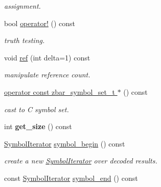 \begin{DoxyCompactItemize}
\begin{DoxyCompactList}\small\item\em assignment. \end{DoxyCompactList}\item 
\hypertarget{classzbar_1_1_symbol_set_a716f662ca284be814f013726361a3723}{
bool \hyperlink{classzbar_1_1_symbol_set_a716f662ca284be814f013726361a3723}{operator!} () const }
\label{classzbar_1_1_symbol_set_a716f662ca284be814f013726361a3723}

\begin{DoxyCompactList}\small\item\em truth testing. \end{DoxyCompactList}\item 
\hypertarget{classzbar_1_1_symbol_set_a9dc9218a6391a4bfdef5eca99d1bb71f}{
void \hyperlink{classzbar_1_1_symbol_set_a9dc9218a6391a4bfdef5eca99d1bb71f}{ref} (int delta=1) const }
\label{classzbar_1_1_symbol_set_a9dc9218a6391a4bfdef5eca99d1bb71f}

\begin{DoxyCompactList}\small\item\em manipulate reference count. \end{DoxyCompactList}\item 
\hypertarget{classzbar_1_1_symbol_set_aaa8e3d22c9fe7087fd34b89679425ca5}{
\hyperlink{classzbar_1_1_symbol_set_aaa8e3d22c9fe7087fd34b89679425ca5}{operator const zbar\_\-symbol\_\-set\_\-t $\ast$} () const }
\label{classzbar_1_1_symbol_set_aaa8e3d22c9fe7087fd34b89679425ca5}

\begin{DoxyCompactList}\small\item\em cast to C symbol set. \end{DoxyCompactList}\item 
\hypertarget{classzbar_1_1_symbol_set_accd4d097cdee473338e1983a7370961a}{
int {\bfseries get\_\-size} () const }
\label{classzbar_1_1_symbol_set_accd4d097cdee473338e1983a7370961a}

\item 
\hypertarget{classzbar_1_1_symbol_set_a58b03c71b043383ddd7bcf39567695e1}{
\hyperlink{classzbar_1_1_symbol_iterator}{SymbolIterator} \hyperlink{classzbar_1_1_symbol_set_a58b03c71b043383ddd7bcf39567695e1}{symbol\_\-begin} () const }
\label{classzbar_1_1_symbol_set_a58b03c71b043383ddd7bcf39567695e1}

\begin{DoxyCompactList}\small\item\em create a new \hyperlink{classzbar_1_1_symbol_iterator}{SymbolIterator} over decoded results. \end{DoxyCompactList}\item 
\hypertarget{classzbar_1_1_symbol_set_a80830842fd582f166d4c8d06cd9cbd3a}{
const \hyperlink{classzbar_1_1_symbol_iterator}{SymbolIterator} \hyperlink{classzbar_1_1_symbol_set_a80830842fd582f166d4c8d06cd9cbd3a}{symbol\_\-end} () const }
\label{classzbar_1_1_symbol_set_a80830842fd582f166d4c8d06cd9cbd3a}


\end{DoxyCompactItemize}
